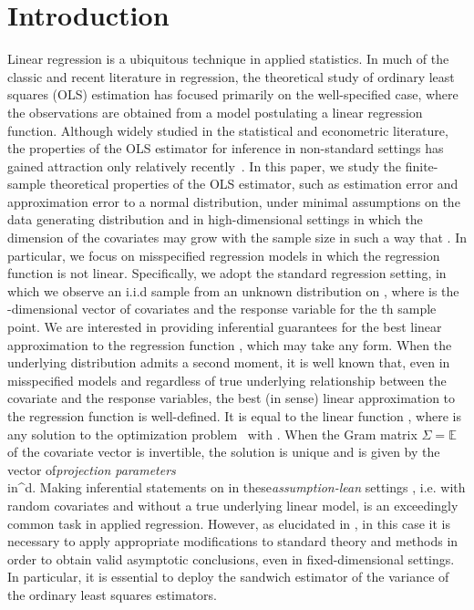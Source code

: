\documentclass{article}
\begin{document}
\section{Introduction}
Linear regression is a ubiquitous technique in applied statistics. In much of the classic and recent literature in regression, the theoretical study of ordinary least squares (OLS) estimation has focused primarily on the well-specified case, where the observations are obtained from a model postulating a linear regression function. Although widely studied in the statistical and econometric literature, the properties of the OLS estimator for inference in non-standard settings has gained attraction only relatively recently~\citep{Buja14,Buja16,Uniform:Kuch18}.
In this paper, we study the finite-sample theoretical properties of the OLS estimator, such as estimation error and approximation error to a normal distribution, under minimal assumptions on the data generating distribution and in high-dimensional settings in which the dimension   of the covariates may grow with the sample size   in such a way that  . In particular, we focus on misspecified regression models in which the regression function is not linear.
Specifically, we adopt the standard regression setting,
in which we observe an i.i.d sample   from an unknown distribution   on  , where   is the  -dimensional vector of covariates and   the response variable for the  th sample point.
We are interested in providing inferential guarantees for the best linear approximation to the
regression function  , which may take any form.
When the underlying
distribution   admits a second moment, it is well known \citep{Buja14} that, even in misspecified models and regardless of true underlying relationship between the covariate and the response variables, the best (in   sense) linear approximation to the regression function is well-defined. It is equal to the linear function
 , where   is any solution to the optimization problem
\,
\]
with  .
When the Gram matrix $\Sigma
= \mathbb{E}$ of the covariate vector is invertible, the solution is unique and is given by the vector of{\it projection parameters}
\\in{}^d.
\]
Making inferential statements on   in these{\it assumption-lean} settings \citep{Buja14}, i.e. with random covariates and without a true underlying linear model, is an exceedingly common task in applied regression. However, as elucidated in \cite{Buja14}, in this case it is necessary to apply appropriate modifications to standard theory and methods in order to obtain valid asymptotic conclusions, even in fixed-dimensional settings. In particular, it is essential to deploy the sandwich estimator \citep{White1980,Buja14} of the variance of the ordinary least squares estimators.
\end{document}
